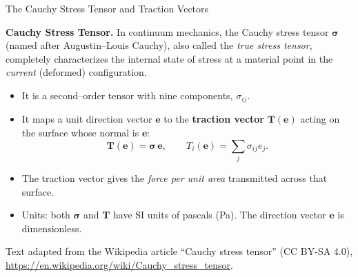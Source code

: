 \documentclass[aspectratio=169,11pt]{beamer}
\begin{document}
\begin{frame}{The Cauchy Stress Tensor and Traction Vectors}

\textbf{Cauchy Stress Tensor.}
In continuum mechanics, the Cauchy stress tensor 
$\boldsymbol{\sigma}$ (named after Augustin–Louis Cauchy), also
called the \emph{true stress tensor}, completely characterizes
the internal state of stress at a material point in the
\emph{current} (deformed) configuration.

\medskip

\begin{itemize}
    \item It is a second–order tensor with nine components, $\sigma_{ij}.$

    \item It maps a unit direction vector $\mathbf{e}$ to the
          \textbf{traction vector} $\mathbf{T}(\mathbf{e})$ acting
          on the surface whose normal is $\mathbf{e}$:
    \[
        \mathbf{T}(\mathbf{e}) = \boldsymbol{\sigma}\,\mathbf{e},
        \qquad
        T_i(\mathbf{e}) = \sum_j \sigma_{ij} e_j.
    \]

    \item The traction vector gives the \emph{force per unit area}
          transmitted across that surface.

    \item Units: both $\boldsymbol{\sigma}$ and $\mathbf{T}$ have
          SI units of pascals (Pa). The direction vector
          $\mathbf{e}$ is dimensionless.
\end{itemize}

\vspace{1mm}
{\tiny\color{DarkGray}Text adapted from the Wikipedia article ``Cauchy stress tensor'' (CC BY-SA 4.0), \url{https://en.wikipedia.org/wiki/Cauchy_stress_tensor}.\par}

\end{frame}
\end{document}
